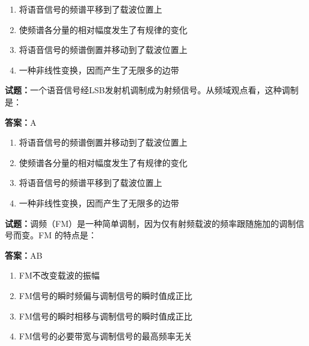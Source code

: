 \documentclass{ctexbook}
\begin{document}
\begin{enumerate}[leftmargin=3em]
  \item 将语音信号的频谱平移到了载波位置上 

  \item 使频谱各分量的相对幅度发生了有规律的变化 

  \item 将语音信号的频谱倒置并移动到了载波位置上 

  \item 一种非线性变换，因而产生了无限多的边带 

\end{enumerate}





\vspace{1em}

\textbf{试题：}一个语音信号经LSB发射机调制成为射频信号。从频域观点看，这种调制是： 

\textbf{答案：}A 

\begin{enumerate}[leftmargin=3em]
  \item 将语音信号的频谱倒置并移动到了载波位置上 

  \item 使频谱各分量的相对幅度发生了有规律的变化 

  \item 将语音信号的频谱平移到了载波位置上 

  \item 一种非线性变换，因而产生了无限多的边带 

\end{enumerate}





\vspace{1em}

\textbf{试题：}调频（FM）是一种简单调制，因为仅有射频载波的频率跟随施加的调制信号而变。FM
的特点是： 

\textbf{答案：}AB 

\begin{enumerate}[leftmargin=3em]
  \item FM不改变载波的振幅 

  \item FM信号的瞬时频偏与调制信号的瞬时值成正比 

  \item FM信号的瞬时相移与调制信号的瞬时值成正比 

  \item FM信号的必要带宽与调制信号的最高频率无关 

\end{enumerate}
\end{document}
